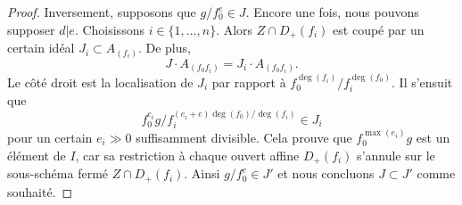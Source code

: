 \begin{proof}
\medskip\noindent
Inversement, supposons que  $g/f_0^e \in J$. Encore une fois, nous pouvons supposer
 $d | e$. Choisissons  $i \in \{1, \ldots, n\}$. Alors  $Z \cap D_{+}(f_i)$  est coupé par un certain
idéal  $J_i \subset A_{(f_i)}$. De plus,
$$
J \cdot A_{(f_0f_i)} = J_i \cdot A_{(f_0f_i)}.
$$
Le côté droit est la localisation de  $J_i$  par rapport à  $f_0^{\deg(f_i)}/f_i^{\deg(f_0)}$. Il
s'ensuit que
$$
f_0^{e_i}g/f_i^{(e_i + e)\deg(f_0)/\deg(f_i)} \in J_i
$$
pour un certain  $e_i \gg 0$  suffisamment divisible. Cela prouve que  $f_0^{\max(e_i)}g$ 
est un élément de  $I$, car sa restriction à chaque ouvert affine
 $D_{+}(f_i)$  s'annule sur le sous-schéma fermé  $Z \cap D_{+}(f_i)$. Ainsi  $g/f_0^e \in J'$  et
nous concluons  $J \subset J'$  comme souhaité.
\end{proof}


